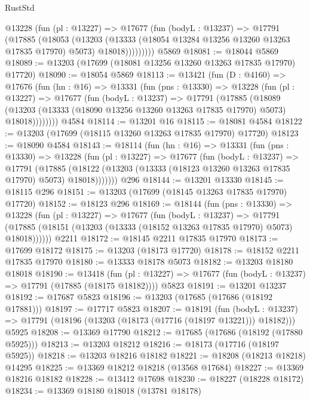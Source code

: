 \begin{lexlean}{RustStd}
\begin{coremodule}
          @13228
            (fun (pl : @13227) =>
            @17677
              (fun (bodyL : @13237) =>
              @17791
                (@17885
                  (@18053
                    (@13203
                      (@13333 (@18054 @13284 @13256 @13260 @13263 @17835 @17970) @5073)
                      @18018)))))))))
    @5869
@18081 := @18044 @5869
@18089 := @13203 (@17699 (@18081 @13256 @13260 @13263 @17835 @17970) @17720)
@18090 := @18054 @5869
@18113 := @13421
    (fun (D : @4160) =>
    @17676
      (fun (hn : @16) =>
      @13331
        (fun (pns : @13330) =>
        @13228
          (fun (pl : @13227) =>
          @17677
            (fun (bodyL : @13237) =>
            @17791
              (@17885
                (@18089
                  (@13203 (@13333 (@18090 @13256 @13260 @13263 @17835 @17970) @5073) @18018))))))))
    @4584
@18114 := @13201 @16
@18115 := @18081 @4584
@18122 := @13203 (@17699 (@18115 @13260 @13263 @17835 @17970) @17720)
@18123 := @18090 @4584
@18143 := @18114
    (fun (hn : @16) =>
    @13331
      (fun (pns : @13330) =>
      @13228
        (fun (pl : @13227) =>
        @17677
          (fun (bodyL : @13237) =>
          @17791
            (@17885
              (@18122 (@13203 (@13333 (@18123 @13260 @13263 @17835 @17970) @5073) @18018)))))))
    @296
@18144 := @13201 @13330
@18145 := @18115 @296
@18151 := @13203 (@17699 (@18145 @13263 @17835 @17970) @17720)
@18152 := @18123 @296
@18169 := @18144
    (fun (pns : @13330) =>
    @13228
      (fun (pl : @13227) =>
      @17677
        (fun (bodyL : @13237) =>
        @17791 (@17885 (@18151 (@13203 (@13333 (@18152 @13263 @17835 @17970) @5073) @18018))))))
    @2211
@18172 := @18145 @2211 @17835 @17970
@18173 := @17699 @18172
@18175 := @13203 (@18173 @17720)
@18178 := @18152 @2211 @17835 @17970
@18180 := @13333 @18178 @5073
@18182 := @13203 @18180 @18018
@18190 := @13418
    (fun (pl : @13227) => @17677 (fun (bodyL : @13237) => @17791 (@17885 (@18175 @18182))))
    @5823
@18191 := @13201 @13237
@18192 := @17687 @5823
@18196 := @13203 (@17685 (@17686 (@18192 @17881)))
@18197 := @17717 @5823
@18207 := @18191
    (fun (bodyL : @13237) => @17791 (@18196 (@13203 (@18173 (@17716 (@18197 @13221))) @18182)))
    @5925
@18208 := @13369 @17790
@18212 := @17685 (@17686 (@18192 (@17880 @5925)))
@18213 := @13203 @18212
@18216 := @18173 (@17716 (@18197 @5925))
@18218 := @13203 @18216 @18182
@18221 := @18208 (@18213 @18218) @14295
@18225 := @13369 @18212 @18218 (@13568 @17684)
@18227 := @13369 @18216 @18182
@18228 := @13412 @17698
@18230 := @18227 (@18228 @18172)
@18234 := @13369 @18180 @18018 (@13781 @18178)

\end{coremodule}
\end{lexlean}
